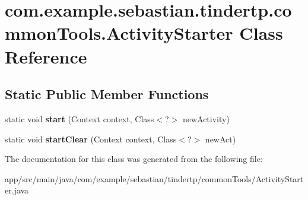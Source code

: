 \hypertarget{classcom_1_1example_1_1sebastian_1_1tindertp_1_1commonTools_1_1ActivityStarter}{}\section{com.\+example.\+sebastian.\+tindertp.\+common\+Tools.\+Activity\+Starter Class Reference}
\label{classcom_1_1example_1_1sebastian_1_1tindertp_1_1commonTools_1_1ActivityStarter}
\subsection*{Static Public Member Functions}
\begin{DoxyCompactItemize}
\item 
static void {\bfseries start} (Context context, Class$<$?$>$ new\+Activity)\hypertarget{classcom_1_1example_1_1sebastian_1_1tindertp_1_1commonTools_1_1ActivityStarter_ae088893a2d716a8e21b1e91690d23d8d}{}\label{classcom_1_1example_1_1sebastian_1_1tindertp_1_1commonTools_1_1ActivityStarter_ae088893a2d716a8e21b1e91690d23d8d}

\item 
static void {\bfseries start\+Clear} (Context context, Class$<$?$>$ new\+Act)\hypertarget{classcom_1_1example_1_1sebastian_1_1tindertp_1_1commonTools_1_1ActivityStarter_a27dd151bf825053b5c39fda87fec561f}{}\label{classcom_1_1example_1_1sebastian_1_1tindertp_1_1commonTools_1_1ActivityStarter_a27dd151bf825053b5c39fda87fec561f}

\end{DoxyCompactItemize}


The documentation for this class was generated from the following file\+:\begin{DoxyCompactItemize}
\item 
app/src/main/java/com/example/sebastian/tindertp/common\+Tools/Activity\+Starter.\+java\end{DoxyCompactItemize}
